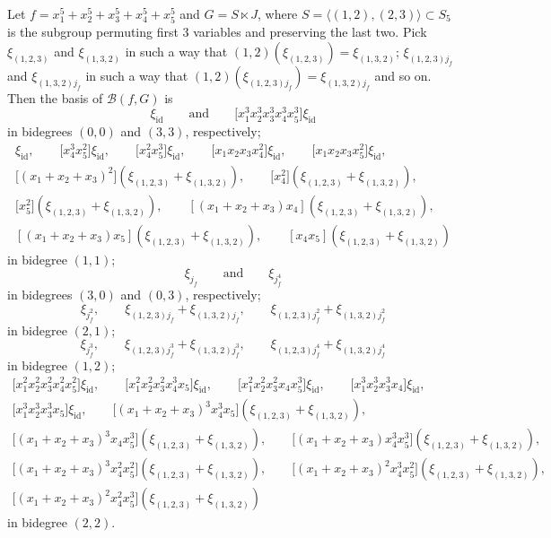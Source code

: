 \documentclass[10pt,a4paper]{amsart}
\numberwithin{equation}{section}
\newcommand{\id}{\mathrm{id}}
\def\B{{\mathcal B}}
\begin{document}
\begin{Example}
Let $f=x_1^5+x_2^5+x_3^5+x_4^5+x_5^5$ and $G=S\ltimes J$, where $S=\langle (1,2), (2,3)\rangle\subset S_5$ is the subgroup permuting first 3 variables and preserving the last two. Pick $\xi_{(1,2,3)}$ and $\xi_{(1,3,2)}$ in such a way that $(1,2)(\xi_{(1,2,3)})=\xi_{(1,3,2)}$; $\xi_{(1,2,3)j_f}$ and $\xi_{(1,3,2)j_f}$ in such a way that $(1,2)(\xi_{(1,2,3)j_f})=\xi_{(1,3,2)j_f}$ and so on. Then the basis of $\B(f,G)$ is
\[
\xi_{\id} \qquad \text{and} \qquad \bigl[x_1^3x_2^3x_3^3x_4^3x_5^3\bigr]\xi_{\id}
\]
in bidegrees $(0,0)$ and $(3,3)$, respectively;
\begin{gather*}
[x_1x_2x_3x_4x_5]\xi_{\id},\qquad\bigl[x_4^3x_5^2\bigr]\xi_{\id},\qquad\bigl[x_4^2x_5^3\bigr]\xi_{\id}, \qquad\bigl[x_1x_2x_3x_4^2\bigr]\xi_{\id},\qquad \bigl[x_1x_2x_3x_5^2\bigr]\xi_{\id},\\
\bigl[(x_1+x_2+x_3)^2\bigr](\xi_{(1,2,3)}+\xi_{(1,3,2)}),\qquad
\bigl[x_4^2\bigr](\xi_{(1,2,3)}+\xi_{(1,3,2)}),\\ \bigl[x_5^2\bigr](\xi_{(1,2,3)}+\xi_{(1,3,2)}),\qquad
[(x_1+x_2+x_3)x_4](\xi_{(1,2,3)}+\xi_{(1,3,2)}),\\ [(x_1+x_2+x_3)x_5](\xi_{(1,2,3)}+\xi_{(1,3,2)}),\qquad [x_4x_5](\xi_{(1,2,3)}+\xi_{(1,3,2)})
\end{gather*}
in bidegree $(1,1)$;
\[
\xi_{j_f} \qquad \text{and} \qquad \xi_{j_f^4}
\]
in bidegrees $(3,0)$ and $(0,3)$, respectively;
\[
\xi_{j_f^2}, \qquad \xi_{(1,2,3)j_f}+\xi_{(1,3,2)j_f}, \qquad \xi_{(1,2,3)j_f^2}+\xi_{(1,3,2)j_f^2}
\]
in bidegree $(2,1)$;
\[
\xi_{j_f^3}, \qquad \xi_{(1,2,3)j_f^3}+\xi_{(1,3,2)j_f^3}, \qquad \xi_{(1,2,3)j_f^4}+\xi_{(1,3,2)j_f^4}
\]
in bidegree $(1,2)$;
\begin{gather*}
\bigl[x_1^2x_2^2x_3^2x_4^2x_5^2\bigr]\xi_{\id},\qquad \bigl[x_1^2x_2^2x_3^2x_4^3x_5\bigr]\xi_{\id},\qquad\bigl[x_1^2x_2^2x_3^2x_4x_5^3\bigr]\xi_{\id}, \qquad\bigl[x_1^3x_2^3x_3^3x_4\bigr]\xi_{\id},\\
\bigl[x_1^3x_2^3x_3^3x_5\bigr]\xi_{\id},\qquad
\bigl[(x_1+x_2+x_3)^3x_4^3x_5\bigr](\xi_{(1,2,3)}+\xi_{(1,3,2)}),\\
\bigl[(x_1+x_2+x_3)^3x_4x_5^3\bigr](\xi_{(1,2,3)}+\xi_{(1,3,2)}),\qquad
\bigl[(x_1+x_2+x_3)x_4^3x_5^3\bigr](\xi_{(1,2,3)}+\xi_{(1,3,2)}),\\
\bigl[(x_1+x_2+x_3)^3x_4^2x_5^2\bigr](\xi_{(1,2,3)}+\xi_{(1,3,2)}),\qquad \bigl[(x_1+x_2+x_3)^2x_4^3x_5^2\bigr](\xi_{(1,2,3)}+\xi_{(1,3,2)}),\\ \bigl[(x_1+x_2+x_3)^2x_4^2x_5^3\bigr](\xi_{(1,2,3)}+\xi_{(1,3,2)})
\end{gather*}
in bidegree $(2,2)$.


\end{Example}
\end{document}
